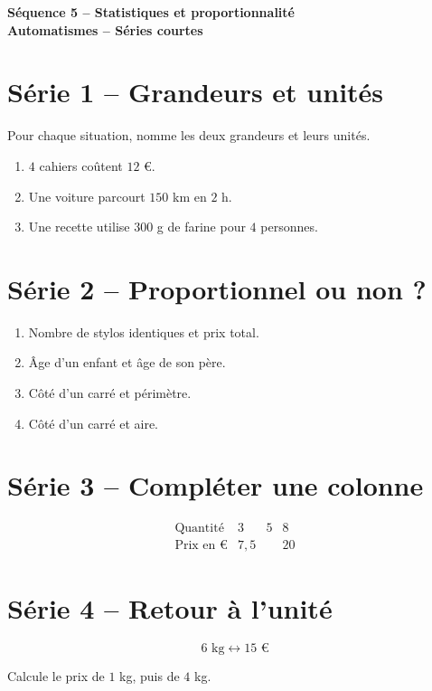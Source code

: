 \documentclass[12pt,a4paper]{article}
\newcommand{\titreseq}[1]{%
\begin{center}
  {\sffamily\LARGE\bfseries\color{TitreC}
  Séquence 5 -- Statistiques et proportionnalité}\\[0.2em]
  {\sffamily\large\bfseries\color{SavoirC}#1}
\end{center}
}
\begin{document}
\titreseq{Automatismes -- Séries courtes}


\section*{Série 1 -- Grandeurs et unités}

Pour chaque situation, nomme les deux grandeurs et leurs unités.

\begin{enumerate}
  \item \(4\) cahiers coûtent \(12\) €.
  \item Une voiture parcourt \(150\) km en \(2\) h.
  \item Une recette utilise \(300\) g de farine pour \(4\) personnes.
\end{enumerate}

\section*{Série 2 -- Proportionnel ou non ?}

\begin{enumerate}
  \item Nombre de stylos identiques et prix total.
  \item Âge d'un enfant et âge de son père.
  \item Côté d'un carré et périmètre.
  \item Côté d'un carré et aire.
\end{enumerate}

\section*{Série 3 -- Compléter une colonne}

\[
\begin{array}{c|ccc}
\text{Quantité} & 3 & 5 & 8\\
\hline
\text{Prix en €} & 7{,}5 & & 20
\end{array}
\]

\section*{Série 4 -- Retour à l'unité}

\[
6\text{ kg}\longleftrightarrow15\text{ €}
\]

Calcule le prix de \(1\) kg, puis de \(4\) kg.
\end{document}
